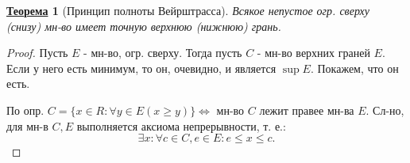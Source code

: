 \documentclass[12pt]{article}
\newtheorem{theorem}{\underline{Теорема}}[section]
\theoremstyle{definition}
\theoremstyle{definition}
\begin{document}
\begin{theorem}[Принцип полноты Вейрштрасса]
Всякое непустое огр. сверху (снизу) мн-во имеет точную верхнюю (нижнюю) грань.
\end{theorem}

\begin{proof}
Пусть $E$ - мн-во, огр. сверху. Тогда пусть $C$ - мн-во верхних граней $E$. Если у него есть минимум, то он, очевидно, и является $\sup E$. Покажем, что он есть.

По опр. $C = \{x \in R \colon \forall y \in E (x \geq y)\} \iff $ мн-во $C$ лежит правее мн-ва $E$. Сл-но, для мн-в $C, E$ выполняется аксиома непрерывности, т. е.: 
\[
\exists x \colon \forall c \in C, e \in E \colon e \leq x \leq c
.\] 
\end{proof}
\end{document}
